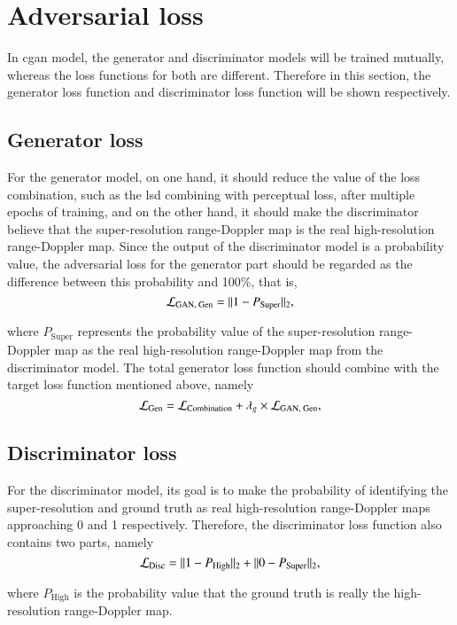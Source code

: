 \section{Adversarial loss} \label{gan loss}
In \gls{cgan} model, the generator and discriminator models will be trained mutually, whereas the loss functions for both are different. Therefore in this section, the generator loss function and discriminator loss function will be shown respectively.

\subsection{Generator loss}
For the generator model, on one hand, it should reduce the value of the loss combination, such as the \gls{lsd} combining with perceptual loss, after multiple epochs of training, and on the other hand, it should make the discriminator believe that the super-resolution range-Doppler map is the real high-resolution range-Doppler map. Since the output of the discriminator model is a probability value, the adversarial loss for the generator part should be regarded as the difference between this probability and 100\%, that is,
\begin{equation}
    \centering
    \mathcal{L}_{\text{GAN, Gen}} = \| 1 - P_{\text{Super}} \|_{2},
\end{equation}

where $P_{\text{Super}}$ represents the probability value of the super-resolution range-Doppler map as the real high-resolution range-Doppler map from the discriminator model. The total generator loss function should combine with the target loss function mentioned above, namely
\begin{equation}
    \centering
    \mathcal{L}_{\text{Gen}} = \mathcal{L}_{\text{Combination}} + \lambda_g \times \mathcal{L}_{\text{GAN, Gen}},
\end{equation}

\subsection{Discriminator loss}
For the discriminator model, its goal is to make the probability of identifying the super-resolution and ground truth as real high-resolution range-Doppler maps approaching 0 and 1 respectively. Therefore, the discriminator loss function also contains two parts, namely
\begin{equation}
    \centering
    \mathcal{L}_{\text{Disc}} = \| 1 - P_{\text{High}} \|_{2} + \| 0 - P_{\text{Super}} \|_{2},
\end{equation}

where $P_{\text{High}}$ is the probability value that the ground truth is really the high-resolution range-Doppler map.

